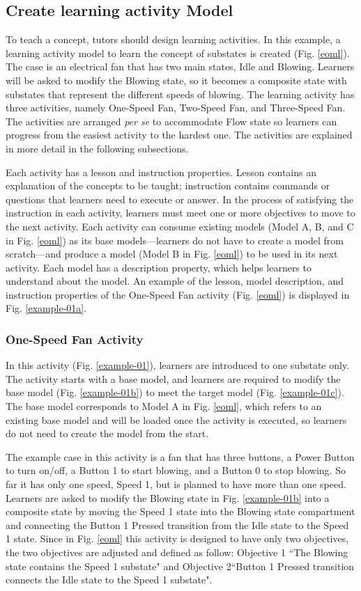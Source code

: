 \documentclass[conference]{IEEEtran}
\begin{document}
\subsection{Create learning activity Model}
To teach a concept, tutors should design learning activities. In this example, a learning activity model to learn the concept of substates is created (Fig. \ref{eoml}). The case is an electrical fan that has two main states, Idle and Blowing. Learners will be asked to modify the Blowing state, so it becomes a composite state with substates that represent the different speeds of blowing. The learning activity has three activities, namely One-Speed Fan, Two-Speed Fan, and Three-Speed Fan. The activities are arranged \textit{per se} to accommodate Flow state \cite{csikszentmihalyi2014toward} so learners can progress from the easiest activity to the hardest one. The activities are explained in more detail in the following subsections.
  
Each activity has a lesson and instruction properties. Lesson contains an explanation of the concepts to be taught; instruction contains commands or questions that learners need to execute or answer. In the process of satisfying the instruction in each activity, learners must meet one or more objectives to move to the next activity. Each activity can consume existing models (Model A, B, and C in Fig. \ref{eoml}) as its base models---learners do not have to create a model from scratch---and produce a model (Model B in Fig. \ref{eoml}) to be used in its next activity. Each model has a description property, which helps learners to understand about the model. An example of the lesson, model description, and instruction properties of the One-Speed Fan activity (Fig. \ref{eoml}) is displayed in Fig. \ref{example-01a}.    


\subsubsection{One-Speed Fan Activity}
In this activity (Fig. \ref{example-01}), learners are introduced to one substate only. The activity starts with a base model, and learners are required to modify the base model (Fig. \ref{example-01b}) to meet the target model (Fig. \ref{example-01c}). The base model corresponds to Model A in Fig. \ref{eoml}, which refers to an existing base model and will be loaded once the activity is executed, so learners do not need to create the model from the start. 

The example case in this activity is a fan that has three buttons, a Power Button to turn on/off, a Button 1 to start blowing, and a Button 0 to stop blowing. So far it has only one speed, Speed 1, but is planned to have more than one speed. Learners are asked to modify the Blowing state in Fig. \ref{example-01b} into a composite state by moving the Speed 1 state into the Blowing state compartment and connecting the Button 1 Pressed transition from the Idle state to the Speed 1 state. Since in Fig. \ref{eoml} this activity is designed to have only two objectives, the two objectives are adjusted and defined as follow: Objective 1 ``The Blowing state contains the Speed 1 substate" and Objective 2``Button 1 Pressed transition connects the Idle state to the Speed 1 substate".
\end{document}
